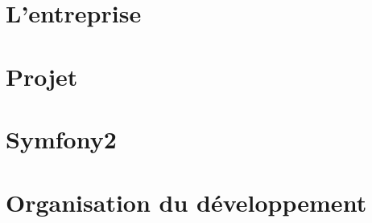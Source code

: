 \documentclass[a4paper]{report}
\begin{document}
\newcommand{\HRule}{\rule{\linewidth}{0.5mm}}



~
\thispagestyle{empty}

 


\tableofcontents
\thispagestyle{empty}

\renewcommand{\arraystretch}{1.5}


~
\thispagestyle{empty}
\newpage

\part{L'entreprise}

\part{Projet}

\part{Symfony2}

\part{Organisation du développement}



\newpage

\nocite{*}




\end{document}
